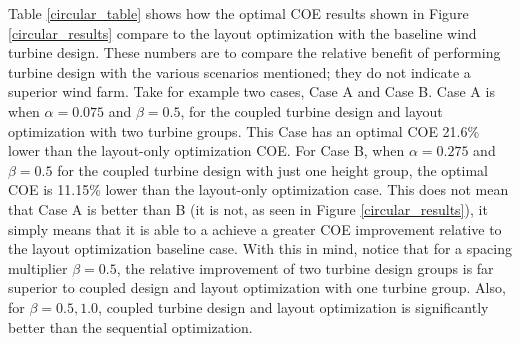Table \ref{circular_table} shows how the optimal COE results shown in Figure \ref{circular_results} compare to the layout optimization with the baseline wind turbine design. These numbers are to compare the relative benefit of performing turbine design with the various scenarios mentioned; they do not indicate a superior wind farm. Take for example two cases, Case A and Case B. Case A is when $\alpha=0.075$ and $\beta=0.5$, for the coupled turbine design and layout optimization with two turbine groups. This Case has an optimal COE 21.6\% lower than the layout-only optimization COE. For Case B, when $\alpha=0.275$ and $\beta=0.5$ for the coupled turbine design with just one height group, the optimal COE is 11.15\% lower than the layout-only optimization case. This does not mean that Case A is better than B (it is not, as seen in Figure \ref{circular_results}), it simply means that it is able to a achieve a greater COE improvement relative to the layout optimization baseline case. With this in mind, notice that for a spacing multiplier $\beta=0.5$, the relative improvement of two turbine design groups is far superior to coupled design and layout optimization with one turbine group. Also, for $\beta=0.5,1.0$, coupled turbine design and layout optimization is significantly better than the sequential optimization.


